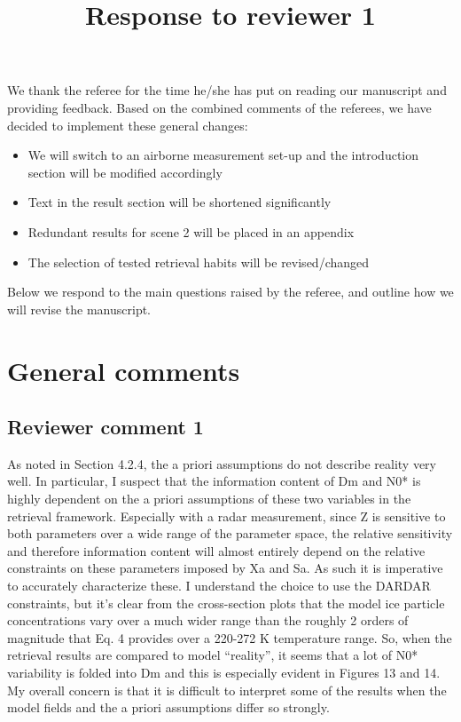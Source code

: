\documentclass[11pt]{scrartcl}
\title{Response to reviewer 1}
\date{}
\begin{document}
\maketitle

\setlength{\parindent}{0cm}

We thank the referee for the time he/she has put on reading our manuscript and
providing feedback. Based on the combined comments of the referees, we have
decided to implement these general changes:

\begin{itemize}
\item We will switch to an airborne measurement set-up and
  the introduction section will be modified accordingly
\item Text in the result section will be shortened significantly
\item Redundant results for scene 2 will be placed in an appendix
\item The selection of tested retrieval habits will be revised/changed
\end{itemize}

Below we respond to the main questions raised by the referee, and outline how we will
revise the manuscript.

\section{General comments}

\subsection*{Reviewer comment 1}

As noted in Section 4.2.4, the a priori assumptions do not describe reality very
well. In particular, I suspect that the information content of Dm and N0* is
highly dependent on the a priori assumptions of these two variables in the
retrieval framework. Especially with a radar measurement, since Z is sensitive
to both parameters over a wide range of the parameter space, the relative
sensitivity and therefore information content will almost entirely depend on the
relative constraints on these parameters imposed by Xa and Sa. As such it is
imperative to accurately characterize these. I understand the choice to use the
DARDAR constraints, but it’s clear from the cross-section plots that the model
ice particle concentrations vary over a much wider range than the roughly 2
orders of magnitude that Eq. 4 provides over a 220-272 K temperature range. So,
when the retrieval results are compared to model “reality”, it seems that a lot
of N0* variability is folded into Dm and this is especially evident in Figures
13 and 14. My overall concern is that it is difficult to interpret some of the
results when the model fields and the a priori assumptions differ so strongly.
\end{document}
